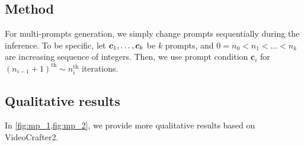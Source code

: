 \subsection{Method}
\label{app:mp_alg}

For multi-prompts generation, we simply change prompts sequentially during the inference.
To be specific, let $\bm{c}_1, \myldots, \bm{c}_k$ be $k$ prompts, and $0=n_0 < n_1<\ldots<n_k$ are increasing sequence of integers.
Then, we use prompt condition $\bm{c}_i$ for $(n_{i-1}+1)^\text{th} \sim n_{i}^\text{th}$ iterations.

\subsection{Qualitative results}
\label{app:mp_qual}

In \cref{fig:mp_1,fig:mp_2}, we provide more qualitative results based on VideoCrafter2.

